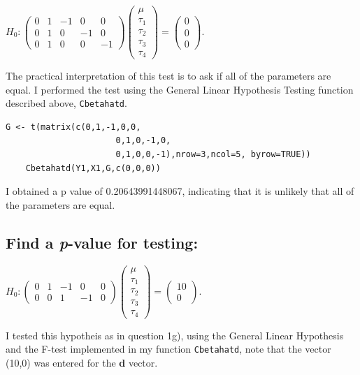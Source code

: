 \documentclass[11pt]{article}
\begin{document}
\( H_0 : \begin{pmatrix} 0 & 1 & -1 & 0 & 0 \\ 0 & 1 & 0 & -1 & 0 \\ 0 & 1 & 0 & 0 & -1 \end{pmatrix} \begin{pmatrix} \mu \\ \tau_1 \\ \tau_2 \\ \tau_3 \\ \tau_4 \end{pmatrix} = \begin{pmatrix} 0 \\ 0 \\ 0 \end{pmatrix}. \) 

The practical interpretation of this test is to ask if all of the
parameters are equal. I performed the test using the General Linear
Hypothesis Testing function described above, \verb~Cbetahatd~. 


\begin{verbatim}
G <- t(matrix(c(0,1,-1,0,0,
                      0,1,0,-1,0,
                      0,1,0,0,-1),nrow=3,ncol=5, byrow=TRUE))
    Cbetahatd(Y1,X1,G,c(0,0,0))
\end{verbatim}


I obtained a p value of 0.20643991448067, indicating that it is
unlikely that all of the parameters are equal. 
\subsection{Find a \emph{p}-value for testing:}
\label{sec-1-8}

\(H_0 : \begin{pmatrix} 0 & 1 & -1 & 0 & 0 \\ 0 & 0 & 1 & -1 & 0
\end{pmatrix} \begin{pmatrix} \mu \\ \tau_1 \\ \tau_2 \\ \tau_3
\\ \tau_4 \end{pmatrix} = \begin{pmatrix} 10 \\ 0  \end{pmatrix}.\)

I tested this hypotheis as in question 1g), using the General Linear
Hypothesis and the F-test implemented in my function \verb~Cbetahatd~,
note that the vector (10,0) was entered for the \textbf{d} vector.
\end{document}
